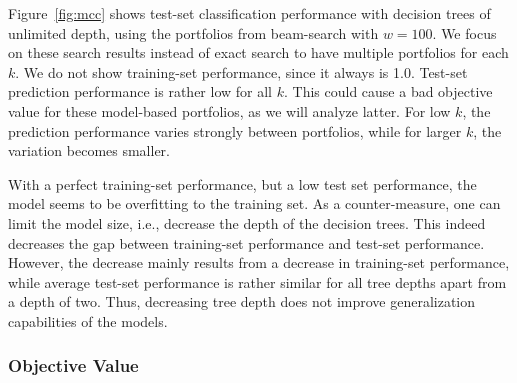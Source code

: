 \documentclass[conference]{IEEEtran}
\begin{document}
Figure~\ref{fig:mcc} shows test-set classification performance with decision trees of unlimited depth, using the portfolios from beam-search with $w=100$.
We focus on these search results instead of exact search to have multiple portfolios for each $k$.
We do not show training-set performance, since it always is 1.0.
Test-set prediction performance is rather low for all $k$.
This could cause a bad objective value for these model-based portfolios, as we will analyze latter.
For low $k$, the prediction performance varies strongly between portfolios, while for larger $k$, the variation becomes smaller.

With a perfect training-set performance, but a low test set performance, the model seems to be overfitting to the training set.
As a counter-measure, one can limit the model size, i.e., decrease the depth of the decision trees.
This indeed decreases the gap between training-set performance and test-set performance.
However, the decrease mainly results from a decrease in training-set performance, while average test-set performance is rather similar for all tree depths apart from a depth of two.
Thus, decreasing tree depth does not improve generalization capabilities of the models.

\subsubsection{Objective Value}
\end{document}
